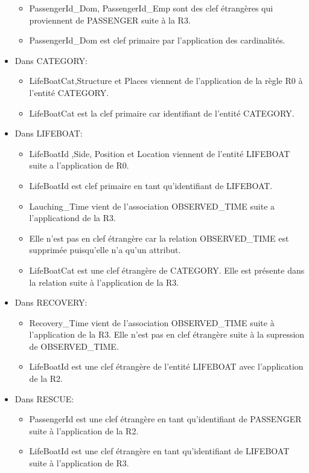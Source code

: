 \documentclass[12pt, a4paper, french]{article}
\begin{document}
\begin{sloppypar}
\begin{itemize}
\begin{itemize}
    \item PassengerId\_Dom, PassengerId\_Emp sont des clef étrangères qui proviennent de PASSENGER suite à la R3. 
	\item PassengerId\_Dom est clef primaire par l'application des cardinalités.
\end{itemize}
\item Dans CATEGORY:
\begin{itemize}
    \item LifeBoatCat,Structure et Places viennent de l'application de la règle R0 à l'entité CATEGORY.
    \item LifeBoatCat est la clef primaire car identifiant de l'entité CATEGORY.
\end{itemize}
\item Dans LIFEBOAT:
\begin{itemize}
    \item LifeBoatId ,Side, Position et Location viennent de l'entité LIFEBOAT suite a l'application de R0.
	\item LifeBoatId est clef primaire en tant qu'identifiant de LIFEBOAT.
    \item Lauching\_Time  vient de l'association OBSERVED\_TIME suite a l'applicationd de la R3. 
	\item Elle n'est pas en clef étrangère car la relation OBSERVED\_TIME est supprimée puisqu'elle n'a qu'un attribut.
    \item LifeBoatCat est une clef étrangère de CATEGORY. Elle est présente dans la relation suite à l'application de la R3.
\end{itemize}
\item Dans RECOVERY:
\begin{itemize}
	\item Recovery\_Time vient de l'association OBSERVED\_TIME suite à l'application de la R3. Elle n'est pas en clef étrangère suite à la supression de OBSERVED\_TIME.
    \item LifeBoatId est une clef étrangère de l'entité LIFEBOAT avec l'application de la R2.
\end{itemize}
\item Dans RESCUE:
\begin{itemize}
    \item PassengerId est une clef étrangère en tant qu'identifiant de PASSENGER suite à l'application de la R2.
    \item LifeBoatId est une clef étrangère en tant qu'identifiant de LIFEBOAT suite à l'application de R3.
\end{itemize}


\end{itemize}
\end{sloppypar}
\end{document}
